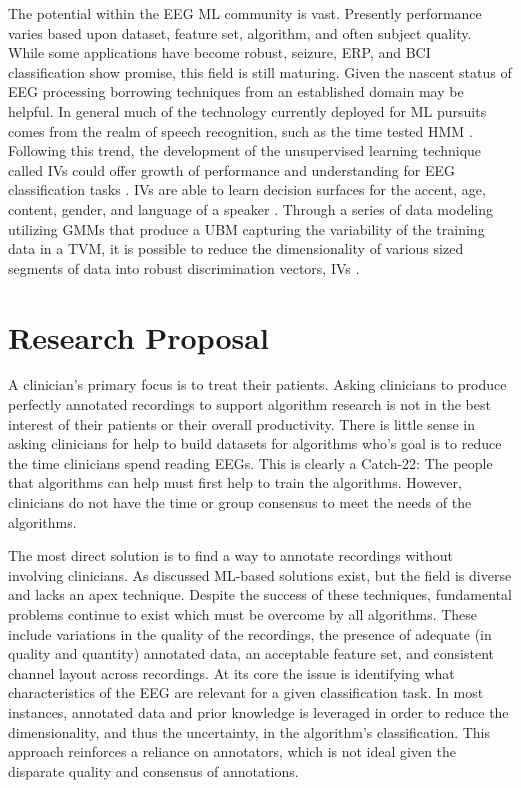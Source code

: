 The potential within the \ac{EEG} \ac{ML} community is vast. Presently performance varies based upon dataset, feature set, algorithm, and often subject quality. While some applications have become robust, seizure, \ac{ERP}, and \ac{BCI} classification show promise, this field is still maturing. Given the nascent status of \ac{EEG} processing borrowing techniques from an established domain may be helpful. In general much of the technology currently deployed for \ac{ML} pursuits comes from the realm of speech recognition, such as the time tested \ac{HMM} \cite{Rabiner1989}. Following this trend, the development of the unsupervised learning technique called \acp{IV} could offer growth of performance and understanding for \ac{EEG} classification tasks \cite{Kenny2008b}. \acp{IV} are able to learn decision surfaces for the accent, age, content, gender, and language of a speaker \cite{Behravan2016}. Through a series of data modeling utilizing \acp{GMM} \cite{Reynolds2009} that produce a \ac{UBM} \cite{Hasan2011} capturing the variability of the training data in a \ac{TVM}, it is possible to reduce the dimensionality of various sized segments of data into robust discrimination vectors, \acp{IV} \cite{Dehak2011a}.

\section{Research Proposal}

A clinician's primary focus is to treat their patients. Asking clinicians to produce perfectly annotated recordings to support algorithm research is not in the best interest of their patients or their overall productivity. There is little sense in asking clinicians for help to build datasets for algorithms who's goal is to reduce the time clinicians spend reading \acp{EEG}. This is clearly a Catch-22:  The people that algorithms can help must first help to train the algorithms. However, clinicians do not have the time or group consensus to meet the needs of the algorithms.

The most direct solution is to find a way to annotate recordings without involving clinicians. As discussed \ac{ML}-based solutions exist, but the field is diverse and lacks an apex technique. Despite the success of these techniques, fundamental problems continue to exist which must be overcome by all algorithms. These include variations in the quality of the recordings, the presence of adequate (in quality and quantity) annotated data, an acceptable feature set, and consistent channel layout across recordings. At its core the issue is identifying what characteristics of the \ac{EEG} are relevant for a given classification task. In most instances, annotated data and prior knowledge is leveraged in order to reduce the dimensionality, and thus the uncertainty, in the algorithm's classification. This approach reinforces a reliance on annotators, which is not ideal given the disparate quality and consensus of annotations.

